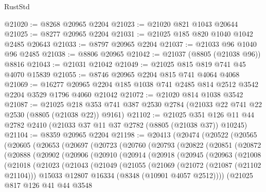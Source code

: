 \begin{lexlean}{RustStd}
\begin{coremodule}
@21020 := @8268 @20965 @2204
@21023 := @21020 @821 @1043 @20644
@21025 := @8277 @20965 @2204
@21031 := @21025 @185 @820 @1040 @1042 @2485 @20643
@21033 := @8797 @20965 @2204
@21037 := @21033 @96 @1040 @96 @2485
@21038 := @8806 @20965
@21042 := @21037 (@8805 (@21038 @96)) @8816
@21043 := @21031 @21042
@21049 := @21025 @815 @819 @741 @45 @4070 @15839
@21055 := @8746 @20965 @2204 @815 @741 @4064 @4068
@21069 := @16277 @20965 @2204 @185 @1038 @741 @2485 @814 @2512 @3542 @2204 @3529 @1796 @4060 @21042
@21072 := @21020 @814 @1038 @3542
@21087 := @21025
    @218
    @353
    @741
    @387
    @2530
    @2784
    (@21033 @22 @741 @22 @2530 (@8805 (@21038 @22)) @9161)
@21102 := @21025
    @351
    @126
    @11
    @44
    @2782
    @2410
    (@21033 @37 @11 @37 @2782 (@8805 (@21038 @37)) @10245)
@21104 := @8359 @20965 @2204
@21198 := @20413
    (@20474
      (@20522
        (@20565
          (@20605
            (@20653
              (@20697
                (@20723
                  (@20760
                    (@20793
                      (@20822
                        (@20851
                          (@20872
                            (@20888
                              (@20902
                                (@20906
                                  (@20910
                                    (@20914
                                      (@20918
                                        (@20945
                                          (@20963
                                            (@21008
                                              (@21018
                                                (@21023
                                                  (@21043
                                                    (@21049
                                                      (@21055
                                                        (@21069
                                                          (@21072 (@21087 (@21102 @21104)))
                                                          @15033
                                                          @12807
                                                          @16334
                                                          (@8348 (@10901 @4057 @2512))))
                                                      (@21025
                                                        @817
                                                        @126
                                                        @41
                                                        @44
                                                        @3548

\end{coremodule}
\end{lexlean}
